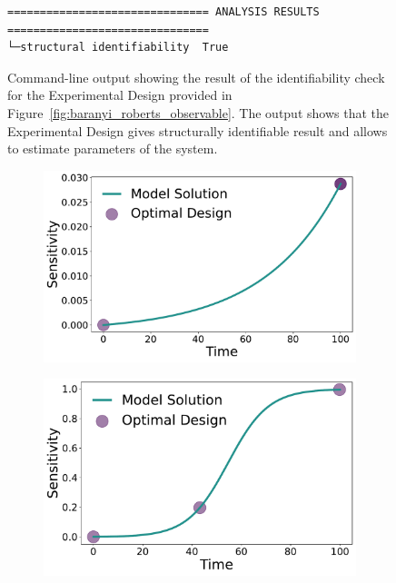 \documentclass[graybox]{svmult}
\begin{document}
\begin{figure}
    \begin{verbatim}
=============================== ANALYSIS RESULTS ===============================
└─structural identifiability  True
    \end{verbatim}
    \caption{{\footnotesize Command-line output showing the result of the identifiability check for the Experimental Design provided in Figure~\ref{fig:baranyi_roberts_observable}.
    The output shows that the Experimental Design gives structurally identifiable result and allows to estimate parameters of the system.}}
    \label{fig:identif_check}
\end{figure}
%
%
\begin{figure}[H]
    \begin{subfigure}{.5\textwidth}
      \centering
      \includegraphics[scale=0.255]{Figures/Sensitivity_Results_baranyi_roberts_ode_fisher_determinant_rel_sensit_cont_2times_2temps_000_x_00_p_00.pdf}
    \end{subfigure}
    \begin{subfigure}{.5\textwidth}
        \centering
        \includegraphics[scale=0.255]{Figures/Sensitivity_Results_baranyi_roberts_ode_fisher_determinant_rel_sensit_cont_2times_2temps_001_x_00_p_00.pdf}

\end{subfigure}
\end{figure}
\end{document}
